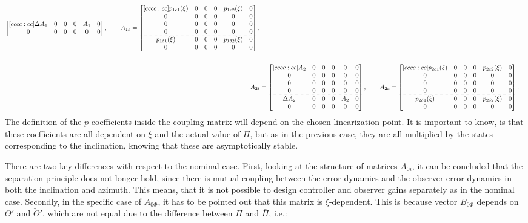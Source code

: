 \documentclass[../main.tex]{subfiles}
\begin{document}
\begin{align}
\begin{bmatrix}[cccc:cc]
%
\Delta A_1 & 0 & 0 & 0 & A_1 & 0\\ 
%
0 & 0 & 0 & 0 & 0 & 0
\end{bmatrix}, \qquad
A_{1c} = \begin{bmatrix}[cccc:cc]	
p_{1e1}(\xi) & 0 & 0 & 0 & p_{1e2}(\xi) & 0\\
0 & 0 & 0 & 0 & 0 & 0\\
0 & 0 & 0 & 0 & 0 & 0\\
%
0 & 0 & 0 & 0 & 0 & 0\\ \hdashline
p_{1\delta 1}(\xi) & 0 & 0 & 0 & p_{1\delta 2}(\xi) & 0\\
0 & 0 & 0 & 0 & 0 & 0		
\end{bmatrix}, \nonumber\\
\nonumber\\
A_{2i} &= 
\begin{bmatrix}[cccc:cc]
A_2 & 0 & 0 & 0 & 0 & 0\\
%
0 & 0 & 0 & 0 & 0 & 0\\
0 & 0 & 0 & 0 & 0 & 0\\
%
0 & 0 & 0 & 0 & 0 & 0\\ \hdashline
%
\Delta A_2 & 0 & 0 & 0 & A_2 & 0\\ 
%
0 & 0 & 0 & 0 & 0 & 0
\end{bmatrix}, \qquad
A_{2c} = \begin{bmatrix}[cccc:cc]	
p_{2e1}(\xi) & 0 & 0 & 0 & p_{2e2}(\xi) & 0\\
0 & 0 & 0 & 0 & 0 & 0\\
0 & 0 & 0 & 0 & 0 & 0\\
%
0 & 0 & 0 & 0 & 0 & 0\\ \hdashline
p_{2\delta 1}(\xi) & 0 & 0 & 0 & p_{2\delta 2}(\xi) & 0\\
0 & 0 & 0 & 0 & 0 & 0		
\end{bmatrix}.	\nonumber	
\end{align}
The definition of the $p$ coefficients inside the coupling matrix will depend on the chosen linearization point. It is important to know, is that these coefficients are all dependent on $\xi$ and the actual value of $\Pi$, but as in the previous case, they are all multiplied by the states corresponding to the inclination, knowing that these are asymptotically stable. 

There are two key differences with respect to the nominal case. First, looking at the structure of matrices $A_{0i}$, it can be concluded that the separation principle does not longer hold, since there is mutual coupling between the error dynamics and the observer error dynamics in both the inclination and azimuth. This means, that it is not possible to design controller and observer gains separately as in the nominal case. Secondly, in the specific case of $A_{0\Phi}$, it has to be pointed out that this matrix is $\xi$-dependent. This is because vector $B_{0\Phi}$ depends on $\Theta'$ and $\check{\Theta}'$, which are not equal due to the difference between $\Pi$ and $\bar{\Pi}$, i.e.:
\end{document}
